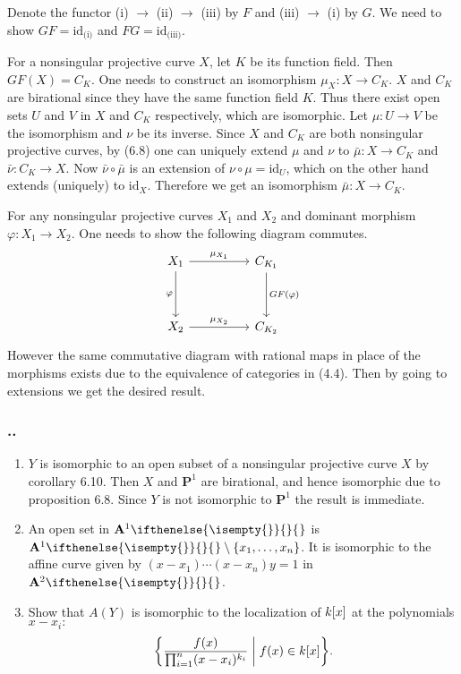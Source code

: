 \documentclass{note}
\newcounter{exercise}[section]
\newcommand{\Ex}{%
    \stepcounter{exercise}%
    \subsubsection*{\thesection.\arabic{exercise}.}%
}
\newcommand{\Affine}[2][]{\mathbf{A}^{#2}\ifthenelse{\isempty{#1}}{}{_{#1}}}
\newcommand{\Proj}[1]{\mathbf{P}^{#1}}
\newcommand{\id}{\mathrm{id}}
\begin{document}


Denote the functor (i) $\to$ (ii) $\to$ (iii) by $F$ and (iii) $\to$ (i) by $G$. We
need to show $GF=\id_{\text{(i)}}$ and $FG=\id_{\text{(iii)}}$.

For a nonsingular projective curve $X$, let $K$ be its function field. Then $GF(X) =
C_K$. One needs to construct an isomorphism $\mu_X\colon X\to C_K$. $X$ and $C_K$
are birational since they have the same function field $K$. Thus there exist open
sets $U$ and $V$ in $X$ and $C_K$ respectively, which are isomorphic. Let $\mu\colon
U\to V$ be the isomorphism and $\nu$ be its inverse. Since $X$ and $C_K$ are both
nonsingular projective curves, by (6.8) one can uniquely extend $\mu$ and $\nu$ to
$\bar\mu\colon X\to C_K$ and $\bar\nu\colon C_K\to X$. Now $\bar\nu\circ\bar\mu$ is
an extension of $\nu\circ\mu = \id_U$, which on the other hand extends (uniquely) to
$\id_X$. Therefore we get an isomorphism $\bar\mu\colon X\to C_K$.

For any nonsingular projective curves $X_1$ and $X_2$ and dominant morphism
$\varphi\colon X_1\to X_2$. One needs to show the following diagram commutes.
\begin{equation*}
  \begin{tikzcd}[row sep=huge,column sep=huge]
    X_1 \arrow{r}{\mu_{X_1}} \arrow[swap]{d}{\varphi} & C_{K_1}
    \arrow{d}{GF(\varphi)} \\ X_2 \arrow{r}{\mu_{X_2}} & C_{K_2}
  \end{tikzcd}
\end{equation*}
However the same commutative diagram with rational maps in place of the morphisms
exists due to the equivalence of categories in (4.4). Then by going to extensions we
get the desired result.


\Ex
\begin{enumerate}
  \item $Y$ is isomorphic to an open subset of a nonsingular projective
        curve $X$ by corollary 6.10. Then $X$ and $\Proj1$ are birational, and hence
        isomorphic due to proposition 6.8. Since $Y$ is not isomorphic to $\Proj1$ the
        result is immediate.
  \item An open set in $\Affine1$ is $\Affine1\setminus\set{x_1}{\dots}{x_n}$. It is
        isomorphic to the affine curve given by $(x-x_1)\cdots(x-x_n)y=1$ in
        $\Affine2$.
  \item Show that $A(Y)$ is isomorphic to the localization of $\polynomials{k}{x}$
        at the polynomials $x-x_i\colon$
        \begin{equation*}
          \set{\frac{f(x)}{\prod_{i=1}^n(x-x_i)^{k_i}} \biggm\vert f(x) \in
            \polynomials{k}{x}}.
        \end{equation*}
\end{enumerate}
\end{document}
